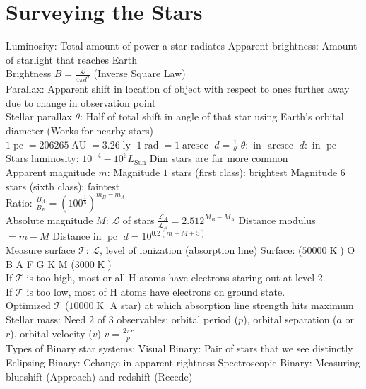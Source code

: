 \documentclass{article}
\DeclareMathOperator{\arcsec}{arcsec}
\DeclareMathOperator{\rad}{rad}
\DeclareMathOperator{\AU}{AU}
\DeclareMathOperator{\ly}{ly}
\DeclareMathOperator{\pc}{pc}
\DeclareMathOperator{\K}{K}
\begin{document}
\section{Surveying the Stars}
Luminosity: Total amount of power a star radiates \qquad Apparent brightness: Amount of starlight that reaches Earth\\
Brightness $B=\frac{\mathcal{L}}{4\pi d^{2}}$ (Inverse Square Law)\\
Parallax: Apparent shift in location of object with respect to ones further away due to change in observation point\\
Stellar parallax $\theta$: Half of total shift in angle of that star using Earth's orbital diameter (Works for nearby stars)\\
$1\pc=206265\AU=3.26\ly$ \qquad $1\rad=1\arcsec$ \qquad $d=\frac{1}{\theta}$ \quad $\theta:$ in $\arcsec$ \quad $d:$ in $\pc$\\
Stars luminosity: $10^{-4}-10^{6}L_{\text{Sun}}$ \quad Dim stars are far more common\\
Apparent magnitude $m$: Magnitude $1$ stars (first class): brightest \quad Magnitude $6$ stars (sixth class): faintest\\
Ratio: $\frac{B_{A}}{B_{B}}=(100^{\frac{1}{5}})^{m_{B}-m_{A}}$\\
Absolute magnitude $M$: $\mathcal{L}$ of stars \qquad $\frac{\mathcal{L}_{A}}{\mathcal{L}_{B}}=2.512^{M_{B}-M_{A}}$ \qquad Distance modulus $=m-M$ \quad Distance in $\pc$ $d=10^{0.2(m-M+5)}$\\
Measure surface $\mathcal{T}$: $\mathcal{L}$, level of ionization (absorption line) \quad Surface: ($50000\K$) O B A F G K M ($3000\K$)\\
If $\mathcal{T}$ is too high, most or all H atoms have electrons staring out at level 2.\\
If $\mathcal{T}$ is too low, most of H atoms have electrons on ground state.\\
Optimized $\mathcal{T}$ ($10000\K$ A star) at which absorption line strength hits maximum\\
Stellar mass: Need $2$ of $3$ observables: orbital period ($p$), orbital separation ($a$ or $r$), orbital velocity ($v$) $v=\frac{2\pi r}{p}$\\
Types of Binary star systems: Visual Binary: Pair of stars that we see distinctly\\
Eclipsing Binary: Cchange in apparent rightness \qquad Spectroscopic Binary: Measuring blueshift (Approach) and redshift (Recede)\\
\end{document}
